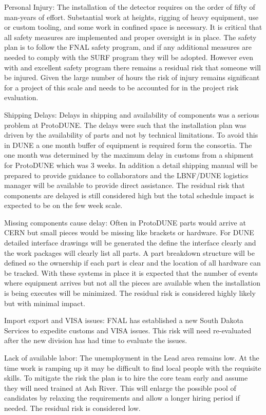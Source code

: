 Personal Injury:
The installation of the detector requires on the order of fifty of man-years of effort. Substantial work at heights, rigging of heavy equipment, use or custom tooling, and some work in confined space is necessary. It is critical that all safety measures are implemented and proper oversight is in place. The safety plan is to follow the FNAL safety program, and if any additional measures are needed to comply with the SURF program they will be adopted. However even with and excellent safety program there remains a residual risk that someone will be injured. Given the large number of hours the risk of injury remains significant for a project of this scale and needs to be accounted for in the project risk evaluation.

Shipping Delays:
Delays in shipping and availability of components was a serious problem at ProtoDUNE. The delays were such that the installation plan was driven by the availability of parts and not by technical limitations. To avoid this in DUNE a one month buffer of equipment is required form the consortia. The one month was determined by the maximum delay in customs from a shipment for ProtoDUNE which was 3 weeks. In addition a detail shipping manual will be prepared to provide guidance to collaborators and the LBNF/DUNE logistics manager will be available to provide direct assistance. The residual risk that components are delayed is still considered high but the total schedule impact is expected to be on the few week scale.

Missing components cause delay:
Often in ProtoDUNE parts would arrive at CERN but small pieces would be missing like brackets or hardware. For DUNE detailed interface drawings will be generated the define the interface clearly and the work packages will clearly list all parts. A part breakdown structure will be defined so the ownership if each part is clear and the location of all hardware can be tracked. With these systems in place it is expected that the number of events where equipment arrives but not all the pieces are available when the installation is being executes will be minimized. The residual risk is considered  highly likely but with minimal impact.

Import export and VISA issues:
FNAL has established a new South Dakota Services to expedite customs and VISA issues. This risk will need re-evaluated after the new division has had time to evaluate the issues.

Lack of available labor:
The unemployment in the Lead area remains low. At the time work is ramping up it may be difficult to find local people with the requisite skills. To mitigate the risk the plan is to hire the core team early and assume they will need trained at Ash River. This will enlarge the possible pool of candidates by relaxing the requirements and allow a longer hiring period if needed. The residual risk is considered low.

